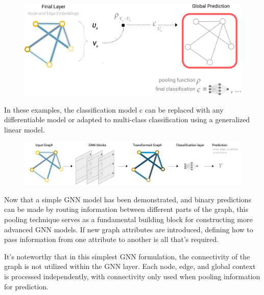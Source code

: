 \begin{figure}[H]
  \centering
  \includegraphics[width=0.7\linewidth]{chap2/6.png}
  \label{fig:usecase}
\end{figure}

In these examples, the classification model c can be replaced with any differentiable model or adapted to multi-class classification using a generalized linear model.


\begin{figure}[H]
  \centering
  \includegraphics[width=0.7\linewidth]{chap2/7.png}
  \label{fig:usecase}
\end{figure}

Now that a simple GNN model has been demonstrated, and binary predictions can be made by routing information between different parts of the graph, this pooling technique serves as a fundamental building block for constructing more advanced GNN models. If new graph attributes are introduced, defining how to pass information from one attribute to another is all that's required.

It's noteworthy that in this simplest GNN formulation, the connectivity of the graph is not utilized within the GNN layer. Each node, edge, and global context is processed independently, with connectivity only used when pooling information for prediction.







